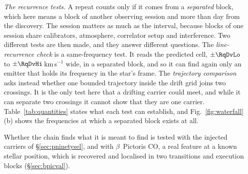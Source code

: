 \emph{The recurrence tests.} A repeat counts only if it comes from a
\emph{separated} block, which here means a block of another observing session
and more than \EpSep{} day from the discovery. The session matters as much as
the interval, because blocks of one session share calibrators, atmosphere,
correlator setup and interference. Two different tests are then made, and
they answer different questions. The \emph{line-recurrence check} is a
same-frequency test. It reads the predicted cell, $\pm\RqDvLo$ to
$\pm\RqDvHi$\,km\,s$^{-1}$ wide, in a separated block, and so it can find
again only an emitter that holds its frequency in the star's frame. The
\emph{trajectory comparison} asks instead whether one bounded trajectory
inside the drift grid joins two crossings. It is the only test here that a
drifting carrier could meet, and while it can separate two crossings it
cannot show that they are one carrier. Table~\ref{tab:quantities} states what
each test can establish, and Fig.~\ref{fig:waterfall}(b) shows the frequencies
at which a separated block exists at all.

Whether the chain finds what it is meant to find is tested with the injected
carriers of \S\ref{sec:pninetysel}, and with $\beta$~Pictoris CO, a real
feature at a known stellar position, which is recovered and localised in two
transitions and \CsBpCoBlocks{} execution blocks (\S\ref{sec:bpicval}).


